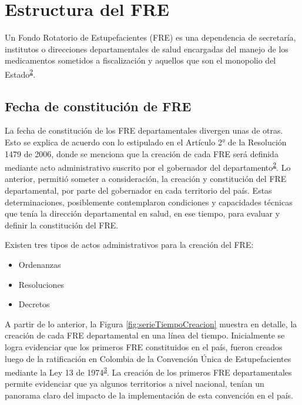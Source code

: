 \documentclass[
]{book}
\providecommand{\tightlist}{%
  \setlength{\itemsep}{0pt}\setlength{\parskip}{0pt}}
\begin{document}
\hypertarget{estructura-del-fre}{%
\chapter{Estructura del FRE}\label{estructura-del-fre}}


Un Fondo Rotatorio de Estupefacientes (FRE) es una dependencia de secretaría, institutos o direcciones departamentales de salud encargadas del manejo de los medicamentos sometidos a fiscalización y aquellos que son el monopolio del Estado\textsuperscript{\protect\hyperlink{ref-MSPS1479-2006}{2}}.

\hypertarget{fecha-de-constituciuxf3n-de-fre}{%
\section{Fecha de constitución de FRE}\label{fecha-de-constituciuxf3n-de-fre}}

La fecha de constitución de los FRE departamentales divergen unas de otras. Esto se explica de acuerdo con lo estipulado en el Artículo 2° de la Resolución 1479 de 2006, donde se menciona que la creación de cada FRE será definida mediante acto administrativo suscrito por el gobernador del departamento\textsuperscript{\protect\hyperlink{ref-MSPS1479-2006}{2}}. Lo anterior, permitió someter a consideración, la creación y constitución del FRE departamental, por parte del gobernador en cada territorio del país. Estas determinaciones, posiblemente contemplaron condiciones y capacidades técnicas que tenía la dirección departamental en salud, en ese tiempo, para evaluar y definir la constitución del FRE.

Existen tres tipos de actos administrativos para la creación del FRE:

\begin{itemize}
\tightlist
\item
  Ordenanzas
\item
  Resoluciones
\item
  Decretos
\end{itemize}

A partir de lo anterior, la Figura \ref{fig:serieTiempoCreacion} muestra en detalle, la creación de cada FRE departamental en una línea del tiempo. Inicialmente se logra evidenciar que los primeros FRE constituidos en el país, fueron creados luego de la ratificación en Colombia de la Convención Única de Estupefacientes mediante la Ley 13 de 1974\textsuperscript{\protect\hyperlink{ref-CongresodelaRepublica1974}{3}}. La creación de los primeros FRE departamentales permite evidenciar que ya algunos territorios a nivel nacional, tenían un panorama claro del impacto de la implementación de esta convención en el país.
\end{document}
